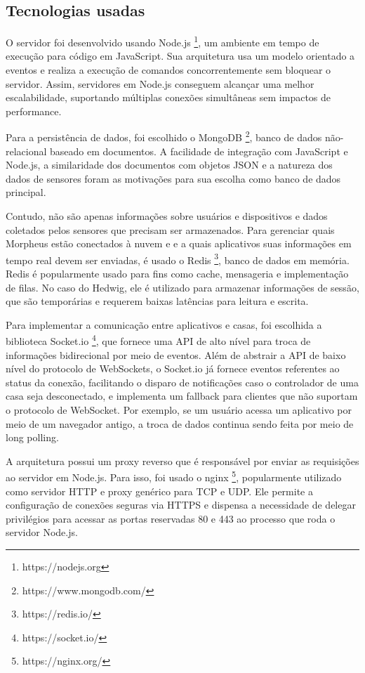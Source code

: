 \subsection{Tecnologias usadas}

O servidor foi desenvolvido usando Node.js \footnote{https://nodejs.org}, um ambiente em tempo de execução para código em JavaScript. Sua arquitetura usa um modelo orientado a eventos e realiza a execução de comandos concorrentemente sem bloquear o servidor. Assim, servidores em Node.js conseguem alcançar uma melhor escalabilidade, suportando múltiplas conexões simultâneas sem impactos de performance.

Para a persistência de dados, foi escolhido o MongoDB \footnote{https://www.mongodb.com/}, banco de dados não-relacional baseado em documentos. A facilidade de integração com JavaScript e Node.js, a similaridade dos documentos com objetos JSON e a natureza dos dados de sensores foram as motivações para sua escolha como banco de dados principal.

Contudo, não são apenas informações sobre usuários e dispositivos e dados coletados pelos sensores que precisam ser armazenados. Para gerenciar quais Morpheus estão conectados à nuvem e e a quais aplicativos suas informações em tempo real devem ser enviadas, é usado o Redis \footnote{https://redis.io/}, banco de dados em memória. Redis é popularmente usado para fins como cache, mensageria e implementação de filas. No caso do Hedwig, ele é utilizado para armazenar informações de sessão, que são temporárias e requerem baixas latências para leitura e escrita.

Para implementar a comunicação entre aplicativos e casas, foi escolhida a biblioteca Socket.io \footnote{https://socket.io/}, que fornece uma API de alto nível para troca de informações bidirecional por meio de eventos. Além de abstrair a API de baixo nível do protocolo de WebSockets, o Socket.io já fornece eventos referentes ao status da conexão, facilitando o disparo de notificações caso o controlador de uma casa seja desconectado, e implementa um fallback para clientes que não suportam o protocolo de WebSocket. Por exemplo, se um usuário acessa um aplicativo por meio de um navegador antigo, a troca de dados continua sendo feita por meio de long polling.

A arquitetura possui um proxy reverso que é responsável por enviar as requisições ao servidor em Node.js. Para isso, foi usado o nginx \footnote{https://nginx.org/}, popularmente utilizado como servidor HTTP e proxy genérico para TCP e UDP. Ele permite a configuração de conexões seguras via HTTPS e dispensa a necessidade de delegar privilégios para acessar as portas reservadas 80 e 443 ao processo que roda o servidor Node.js.

